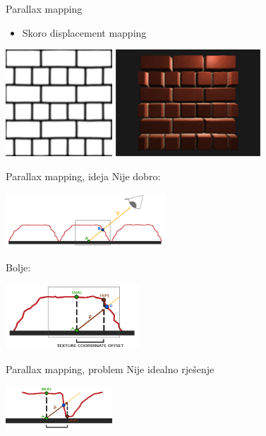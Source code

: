 \documentclass[9pt]{beamer}
\begin{document}
\begin{frame}{Parallax mapping}
	\begin{itemize}
		\item Skoro displacement mapping
	\end{itemize}
	
	\begin{center}
		\includegraphics[height=4cm]{slike/parallax_mapping_height_map.png}
		\includegraphics[height=4cm]{slike/parallax_mapping_plane_heightmap.png}
	\end{center}

\end{frame}
\begin{frame}{Parallax mapping, ideja}
	Nije dobro:
	\begin{center}
		\includegraphics[width=6cm]{slike/parallax_mapping_plane_height.png}
	\end{center}
	Bolje:
	\begin{center}
	\includegraphics[width=5cm]{slike/parallax_mapping_scaled_height.png}
	\end{center}
\end{frame}

\begin{frame}{Parallax mapping, problem}
	Nije idealno rješenje	
	\begin{center}
		\includegraphics[width=4cm]{slike/parallax_mapping_incorrect_p.png}
	\end{center}

\end{frame}
\end{document}
